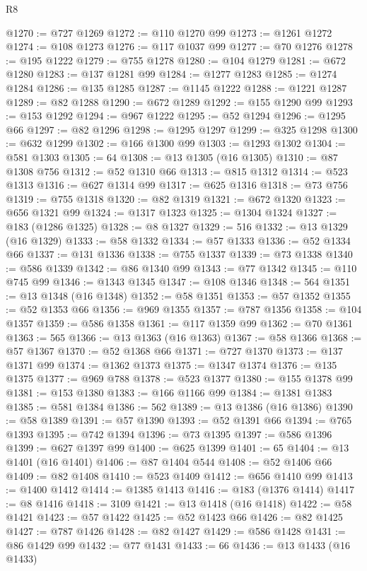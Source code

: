 \begin{lexlean}{R8}
\begin{coremodule}
@1270 := @727 @1269
@1272 := @110 @1270 @99
@1273 := @1261 @1272
@1274 := @108 @1273
@1276 := @117 @1037 @99
@1277 := @70 @1276
@1278 := @195 @1222
@1279 := @755 @1278
@1280 := @104 @1279
@1281 := @672 @1280
@1283 := @137 @1281 @99
@1284 := @1277 @1283
@1285 := @1274 @1284
@1286 := @135 @1285
@1287 := @1145 @1222
@1288 := @1221 @1287
@1289 := @82 @1288
@1290 := @672 @1289
@1292 := @155 @1290 @99
@1293 := @153 @1292
@1294 := @967 @1222
@1295 := @52 @1294
@1296 := @1295 @66
@1297 := @82 @1296
@1298 := @1295 @1297
@1299 := @325 @1298
@1300 := @632 @1299
@1302 := @166 @1300 @99
@1303 := @1293 @1302
@1304 := @581 @1303
@1305 := 64
@1308 := @13 @1305 (@16 @1305)
@1310 := @87 @1308 @756
@1312 := @52 @1310 @66
@1313 := @815 @1312
@1314 := @523 @1313
@1316 := @627 @1314 @99
@1317 := @625 @1316
@1318 := @73 @756
@1319 := @755 @1318
@1320 := @82 @1319
@1321 := @672 @1320
@1323 := @656 @1321 @99
@1324 := @1317 @1323
@1325 := @1304 @1324
@1327 := @183 (@1286 @1325)
@1328 := @8 @1327
@1329 := 516
@1332 := @13 @1329 (@16 @1329)
@1333 := @58 @1332
@1334 := @57 @1333
@1336 := @52 @1334 @66
@1337 := @131 @1336
@1338 := @755 @1337
@1339 := @73 @1338
@1340 := @586 @1339
@1342 := @86 @1340 @99
@1343 := @77 @1342
@1345 := @110 @745 @99
@1346 := @1343 @1345
@1347 := @108 @1346
@1348 := 564
@1351 := @13 @1348 (@16 @1348)
@1352 := @58 @1351
@1353 := @57 @1352
@1355 := @52 @1353 @66
@1356 := @969 @1355
@1357 := @787 @1356
@1358 := @104 @1357
@1359 := @586 @1358
@1361 := @117 @1359 @99
@1362 := @70 @1361
@1363 := 565
@1366 := @13 @1363 (@16 @1363)
@1367 := @58 @1366
@1368 := @57 @1367
@1370 := @52 @1368 @66
@1371 := @727 @1370
@1373 := @137 @1371 @99
@1374 := @1362 @1373
@1375 := @1347 @1374
@1376 := @135 @1375
@1377 := @969 @788
@1378 := @523 @1377
@1380 := @155 @1378 @99
@1381 := @153 @1380
@1383 := @166 @1166 @99
@1384 := @1381 @1383
@1385 := @581 @1384
@1386 := 562
@1389 := @13 @1386 (@16 @1386)
@1390 := @58 @1389
@1391 := @57 @1390
@1393 := @52 @1391 @66
@1394 := @765 @1393
@1395 := @742 @1394
@1396 := @73 @1395
@1397 := @586 @1396
@1399 := @627 @1397 @99
@1400 := @625 @1399
@1401 := 65
@1404 := @13 @1401 (@16 @1401)
@1406 := @87 @1404 @544
@1408 := @52 @1406 @66
@1409 := @82 @1408
@1410 := @523 @1409
@1412 := @656 @1410 @99
@1413 := @1400 @1412
@1414 := @1385 @1413
@1416 := @183 (@1376 @1414)
@1417 := @8 @1416
@1418 := 3109
@1421 := @13 @1418 (@16 @1418)
@1422 := @58 @1421
@1423 := @57 @1422
@1425 := @52 @1423 @66
@1426 := @82 @1425
@1427 := @787 @1426
@1428 := @82 @1427
@1429 := @586 @1428
@1431 := @86 @1429 @99
@1432 := @77 @1431
@1433 := 66
@1436 := @13 @1433 (@16 @1433)

\end{coremodule}
\end{lexlean}
